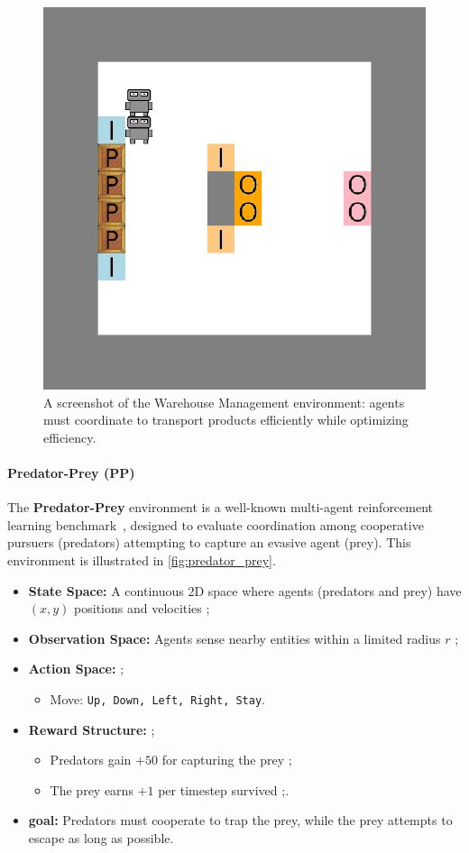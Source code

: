 \documentclass[journal]{IEEEtai}
\begin{document}
\begin{figure}[h!]
  \centering
  \includegraphics[width=0.7\linewidth]{figures/wm.png}
  \caption{A screenshot of the Warehouse Management environment: agents must coordinate to transport products efficiently while optimizing efficiency.}
  \label{fig:warehouse}
\end{figure}

\paragraph{Predator-Prey (PP)}
The \textbf{Predator-Prey} environment is a well-known multi-agent reinforcement learning benchmark~\cite{lowe2017multi}, designed to evaluate coordination among cooperative pursuers (predators) attempting to capture an evasive agent (prey). This environment is illustrated in \autoref{fig:predator_prey}.

\begin{itemize}
    \item \textbf{State Space:} A continuous 2D space where agents (predators and prey) have $(x, y)$ positions and velocities ;
    \item \textbf{Observation Space:} Agents sense nearby entities within a limited radius $r$ ;
    \item \textbf{Action Space:}  ;
    \begin{itemize}
        \item Move: \texttt{Up, Down, Left, Right, Stay}.
    \end{itemize}
    \item \textbf{Reward Structure:} ;
    \begin{itemize}
        \item Predators gain $+50$ for capturing the prey ;
        \item The prey earns $+1$ per timestep survived ;.
    \end{itemize}
    \item \textbf{goal:} Predators must cooperate to trap the prey, while the prey attempts to escape as long as possible.
\end{itemize}
\end{document}
